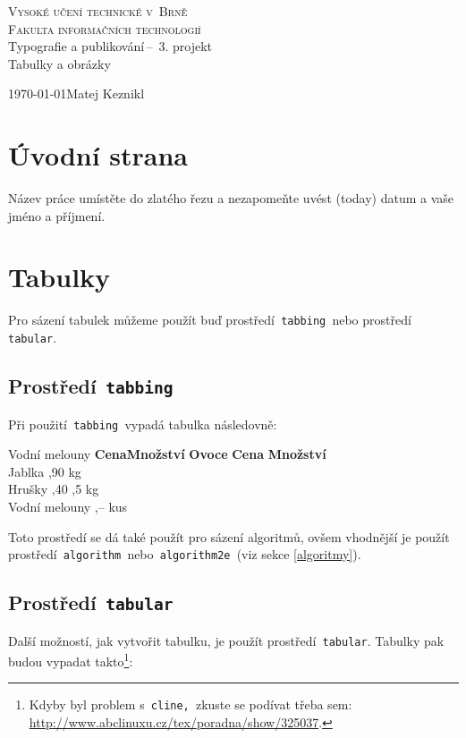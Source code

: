 \documentclass[a4paper, 11pt]{article}
\begin{document}
\begin{titlepage}
	\begin{center} 
		\textsc{\Huge Vysoké učení technické v~Brně\\
			\huge Fakulta informačních technologií \\}
			\LARGE Typografie a publikování\,--\ 3. projekt\\
			\Huge Tabulky a obrázky
			\end{center}
			\Large \today \hfill Matej Keznikl
			\end{titlepage}
									
			\section{Úvodní strana}
			Název práce umístěte do zlatého řezu a nezapomeňte uvést  (today) datum a vaše jméno a příjmení.
									
			\section{Tabulky}
			Pro sázení tabulek můžeme použít buď prostředí\texttt{ tabbing }nebo prostředí\texttt{ tabular}.
									
			\subsection{Prostředí\texttt{ tabbing }}
			Při použití\texttt{ tabbing }vypadá tabulka následovně:
									
			\begin{tabbing}
				Vodní melouny \quad  \=\textbf{Cena}\quad   \=\textbf{Množství}\kill
				\textbf{Ovoce}  \>\textbf{Cena} \>\textbf{Množství}\\
				Jablka          ,90         kg\\
				Hrušky          ,40        ,5 kg\\
				Vodní melouny   ,--         kus\\
			\end{tabbing}
			Toto prostředí se dá také použít pro sázení algoritmů, ovšem vhodnější je použít prostředí\texttt{ algorithm }nebo\texttt{ algorithm2e }(viz sekce \ref{algoritmy}).
									
			\subsection{Prostředí\texttt{ tabular}}
			Další možností, jak vytvořit tabulku, je použít prostředí\texttt{ tabular}. Tabulky pak budou vypadat takto\footnote{Kdyby byl problem s\texttt{ cline, }zkuste se podívat třeba sem: \href{http://www.abclinuxu.cz/tex/poradna/show/325037}{http://www.abclinuxu.cz/tex/poradna/show/325037}.}:
									
\end{document}
